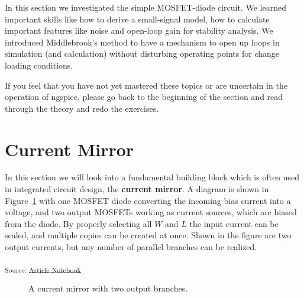 \documentclass[
  a4paper,
  DIV=11,
  numbers=noendperiod]{scrartcl}
\begin{document}
In this section we investigated the simple MOSFET-diode circuit. We
learned important skills like how to derive a small-signal model, how to
calculate important features like noise and open-loop gain for stability
analysis. We introduced Middlebrook's method to have a mechanism to open
up loops in simulation (and calculation) without disturbing operating
points for change loading conditions.

If you feel that you have not yet mastered these topics or are uncertain
in the operation of ngspice, please go back to the beginning of the
section and read through the theory and redo the exercises.

\section{Current Mirror}\label{sec-current-mirror}

In this section we will look into a fundamental building block which is
often used in integrated circuit design, the \textbf{current mirror}. A
diagram is shown in Figure~\ref{fig-current-mirror} with one MOSFET
diode converting the incoming bias current into a voltage, and two
output MOSFETs working as current sources, which are biased from the
diode. By properly selecting all \(W\) and \(L\) the input current can
be scaled, and multiple copies can be created at once. Shown in the
figure are two output currents, but any number of parallel branches can
be realized.

\textsubscript{Source:
\href{https://iic-jku.github.io/analog-circuit-design/index.qmd.html}{Article
Notebook}}

\begin{figure}[H]


\caption{\label{fig-current-mirror}A current mirror with two output
branches.}

\end{figure}%
\end{document}

